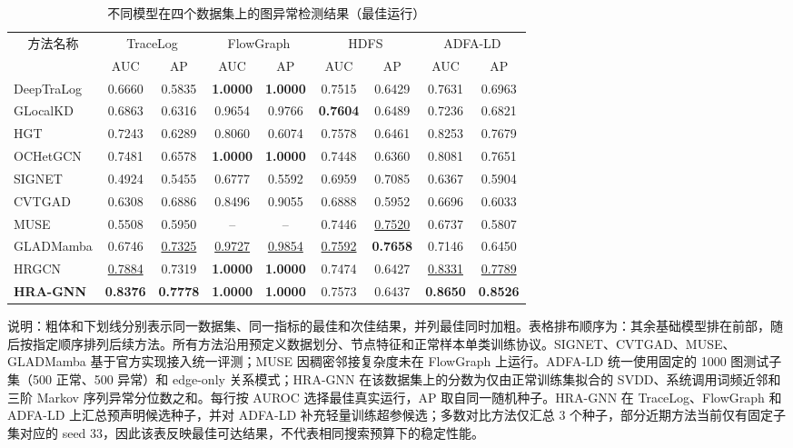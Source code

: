 \begin{table}[t]
\centering
\scriptsize
\renewcommand{\arraystretch}{0.92}
\setlength{\tabcolsep}{3pt}
\caption{不同模型在四个数据集上的图异常检测结果（最佳运行）}
\label{tab:final_auroc_ap_results}
\begin{tabular}{lcccccccc}
\toprule
\multicolumn{1}{c}{\multirow{2}{*}{方法名称}} & \multicolumn{2}{c}{TraceLog} & \multicolumn{2}{c}{FlowGraph} & \multicolumn{2}{c}{HDFS} & \multicolumn{2}{c}{ADFA-LD} \\
\cmidrule(lr){2-3} \cmidrule(lr){4-5} \cmidrule(lr){6-7} \cmidrule(lr){8-9}
 & AUC & AP & AUC & AP & AUC & AP & AUC & AP \\
\midrule
DeepTraLog & 0.6660 & 0.5835 & \textbf{1.0000} & \textbf{1.0000} & 0.7515 & 0.6429 & 0.7631 & 0.6963 \\
\addlinespace
GLocalKD & 0.6863 & 0.6316 & 0.9654 & 0.9766 & \textbf{0.7604} & 0.6489 & 0.7236 & 0.6821 \\
\addlinespace
HGT & 0.7243 & 0.6289 & 0.8060 & 0.6074 & 0.7578 & 0.6461 & 0.8253 & 0.7679 \\
\addlinespace
OCHetGCN & 0.7481 & 0.6578 & \textbf{1.0000} & \textbf{1.0000} & 0.7448 & 0.6360 & 0.8081 & 0.7651 \\
\addlinespace
SIGNET & 0.4924 & 0.5455 & 0.6777 & 0.5592 & 0.6959 & 0.7085 & 0.6367 & 0.5904 \\
\addlinespace
CVTGAD & 0.6308 & 0.6886 & 0.8496 & 0.9055 & 0.6888 & 0.5952 & 0.6696 & 0.6033 \\
\addlinespace
MUSE & 0.5508 & 0.5950 & -- & -- & 0.7446 & \underline{0.7520} & 0.6737 & 0.5807 \\
\addlinespace
GLADMamba & 0.6746 & \underline{0.7325} & \underline{0.9727} & \underline{0.9854} & \underline{0.7592} & \textbf{0.7658} & 0.7146 & 0.6450 \\
\addlinespace
HRGCN & \underline{0.7884} & 0.7319 & \textbf{1.0000} & \textbf{1.0000} & 0.7474 & 0.6427 & \underline{0.8331} & \underline{0.7789} \\
\addlinespace
\textbf{HRA-GNN} & \textbf{0.8376} & \textbf{0.7778} & \textbf{1.0000} & \textbf{1.0000} & 0.7573 & 0.6437 & \textbf{0.8650} & \textbf{0.8526} \\
\bottomrule
\end{tabular}%
\par\vspace{2pt}
\begin{minipage}{\textwidth}
\scriptsize
说明：粗体和下划线分别表示同一数据集、同一指标的最佳和次佳结果，并列最佳同时加粗。表格排布顺序为：其余基础模型排在前部，随后按指定顺序排列后续方法。所有方法沿用预定义数据划分、节点特征和正常样本单类训练协议。SIGNET、CVTGAD、MUSE、GLADMamba 基于官方实现接入统一评测；MUSE 因稠密邻接复杂度未在 FlowGraph 上运行。ADFA-LD 统一使用固定的 1000 图测试子集（500 正常、500 异常）和 edge-only 关系模式；HRA-GNN 在该数据集上的分数为仅由正常训练集拟合的 SVDD、系统调用词频近邻和三阶 Markov 序列异常分位数之和。每行按 AUROC 选择最佳真实运行，AP 取自同一随机种子。HRA-GNN 在 TraceLog、FlowGraph 和 ADFA-LD 上汇总预声明候选种子，并对 ADFA-LD 补充轻量训练超参候选；多数对比方法仅汇总 3 个种子，部分近期方法当前仅有固定子集对应的 seed 33，因此该表反映最佳可达结果，不代表相同搜索预算下的稳定性能。

\end{minipage}
\end{table}
